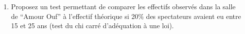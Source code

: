 \documentclass[
]{article}
\providecommand{\tightlist}{%
  \setlength{\itemsep}{0pt}\setlength{\parskip}{0pt}}
\begin{document}
\begin{enumerate}
\def\labelenumi{\alph{enumi}.}
\setcounter{enumi}{1}
\tightlist
\item
  Proposez un test permettant de comparer les effectifs observés dans la
  salle de ``Amour Ouf'' à l'effectif théorique si 20\% des spectateurs
  avaient eu entre 15 et 25 ans (test du chi carré d'adéquation à une
  loi).
\end{enumerate}
\end{document}
